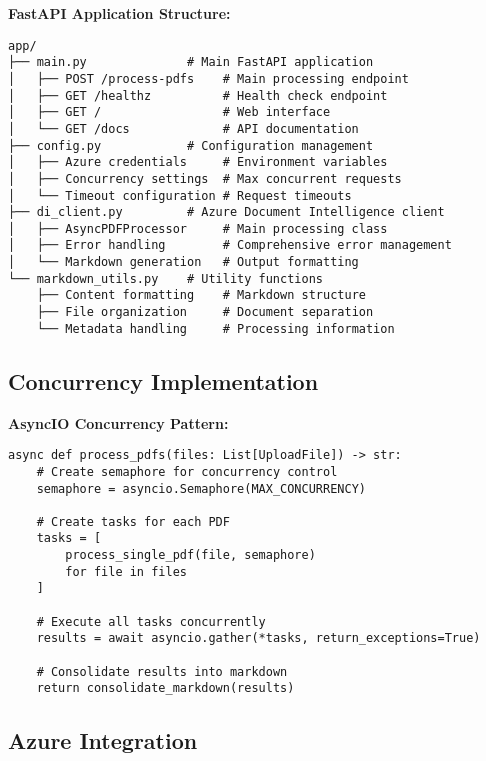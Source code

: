 \documentclass[11pt]{article}
\begin{document}
\begin{techbox}
\textbf{FastAPI Application Structure:}
\begin{verbatim}
app/
├── main.py              # Main FastAPI application
│   ├── POST /process-pdfs    # Main processing endpoint
│   ├── GET /healthz          # Health check endpoint
│   ├── GET /                 # Web interface
│   └── GET /docs             # API documentation
├── config.py            # Configuration management
│   ├── Azure credentials     # Environment variables
│   ├── Concurrency settings  # Max concurrent requests
│   └── Timeout configuration # Request timeouts
├── di_client.py         # Azure Document Intelligence client
│   ├── AsyncPDFProcessor     # Main processing class
│   ├── Error handling        # Comprehensive error management
│   └── Markdown generation   # Output formatting
└── markdown_utils.py    # Utility functions
    ├── Content formatting    # Markdown structure
    ├── File organization     # Document separation
    └── Metadata handling     # Processing information
\end{verbatim}
\end{techbox}

\subsection*{Concurrency Implementation}

\begin{techbox}
\textbf{AsyncIO Concurrency Pattern:}
\begin{verbatim}
async def process_pdfs(files: List[UploadFile]) -> str:
    # Create semaphore for concurrency control
    semaphore = asyncio.Semaphore(MAX_CONCURRENCY)
    
    # Create tasks for each PDF
    tasks = [
        process_single_pdf(file, semaphore) 
        for file in files
    ]
    
    # Execute all tasks concurrently
    results = await asyncio.gather(*tasks, return_exceptions=True)
    
    # Consolidate results into markdown
    return consolidate_markdown(results)
\end{verbatim}
\end{techbox}

\subsection*{Azure Integration}
\end{document}
